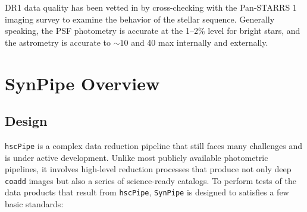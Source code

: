 \documentclass[useamsfonts]{pasj01}
\def\hscpipe{\texttt{hscPipe}}
\def\synpipe{\texttt{SynPipe}}
\def\coadd{\texttt{coadd}}
\begin{document}
\begin{enumerate}
\begin{itemize}
            \end{itemize}
       
    \end{enumerate}

    DR1 data quality has been vetted in \citet{HSCDR1} by cross-checking with the 
    Pan-STARRS 1 imaging survey to examine the behavior of the stellar sequence.
    Generally speaking, the PSF photometry is accurate at the 1--2\% level for bright 
    stars, and the astrometry is accurate to ${\sim}10$ and 40 max internally and 
    externally.


\section{SynPipe Overview}
    \label{sec:synpipe}

\subsection{Design}
    \label{ssec:design}

    \hscpipe{} is a complex data reduction pipeline that still faces many challenges
    and is under active development.
    Unlike most publicly available photometric pipelines, it involves high-level 
    reduction processes that produce not only deep \coadd{} images but also a series 
    of science-ready catalogs. 
    To perform tests of the data products that result from \hscpipe{}, \synpipe{} is 
    designed to satisfies a few basic standards:
\end{document}
